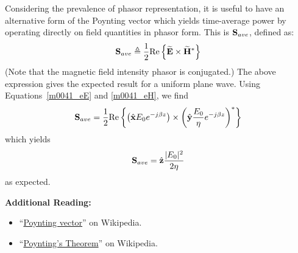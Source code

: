Considering the prevalence of phasor representation, it is useful to have an alternative form of the Poynting vector which yields time-average power by operating directly on field quantities in phasor form.  This is ${\bf S}_{ave}$, defined as:
%
\begin{equation}
{\bf S}_{ave} \triangleq \frac{1}{2} \mbox{Re} \left\{ \widetilde{\bf E} \times \widetilde{\bf H}^* \right\}
\end{equation}
%
(Note that the magnetic field intensity phasor is conjugated.)  
The above expression gives the expected result for a uniform plane wave.
Using Equations~\ref{m0041_eE} and \ref{m0041_eH}, we find
%
\begin{equation}
{\bf S}_{ave} = \frac{1}{2} \mbox{Re} \left\{
  \left( \hat{\bf x}E_0 e^{-j\beta z} \right)
\times
  \left( \hat{\bf y}\frac{E_0}{\eta} e^{-j\beta z} \right)^* \right\}
\end{equation}
%
which yields
%
\begin{equation}
{\bf S}_{ave} = \hat{\bf z}\frac{|E_0|^2}{2\eta} 
\end{equation}
%
as expected.  


{\bf Additional Reading:}
\begin{itemize}
\item ``\href{https://en.wikipedia.org/wiki/Poynting_vector}{Poynting vector}'' on Wikipedia.
\item ``\href{https://en.wikipedia.org/wiki/Poynting's_theorem}{Poynting's Theorem}'' on Wikipedia.
\end{itemize}    

